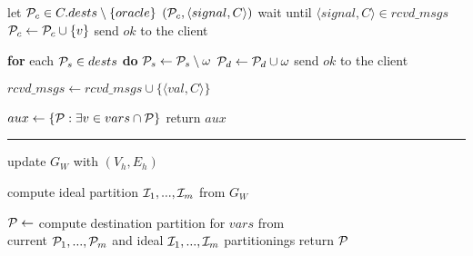 \begin{algorithm}[t!]
\begin{distribalgo}[1]
		\STATE let $\mathcal{P}_c \in C.dests \setminus \{oracle\}$
		\STATE \rmcast$(\mathcal{P}_c, \langle signal, C \rangle )$
		\STATE wait until $\langle signal, C \rangle \in rcvd\_msgs$
		\STATE $\mathcal{P}_c \leftarrow \mathcal{P}_c \cup      \{v\}$
                \STATE send $ok$ to the client
	\ENDINDENT

	\vspace{1.0mm}
                \STATE \textbf{for} each $\mathcal{P}_s \in dests$ \textbf{do} $\mathcal{P}_s \leftarrow \mathcal{P}_s \setminus \omega$
                \STATE $\mathcal{P}_d \leftarrow \mathcal{P}_d \cup \omega$
                \STATE send $ok$ to the client
	\ENDINDENT

        \vspace{1.0mm}
    
		\STATE $rcvd\_msgs \leftarrow rcvd\_msgs \cup \{\langle val, C \rangle\}$
	\ENDINDENT
	
	\vspace{1.0mm}
		\STATE $aux \leftarrow \{ \mathcal{P} : \exists v \in vars \cap \mathcal{P} \}$
		\STATE return $aux$
	\ENDINDENT
	
	\rule{83mm}{0.4pt}

		\STATE update $G_W$ with $(V_h,E_h)$
	\ENDINDENT
	
	\vspace{1.0mm}
    
		\STATE compute ideal partition $\mathcal{I}_1, ..., \mathcal{I}_m$ from $G_W$
	\ENDINDENT
	
	\vspace{1.0mm}
    
		\STATE $\mathcal{P} \leftarrow$ compute destination partition for $vars$ from\\ \hspace{8mm}current $\mathcal{P}_1, ..., \mathcal{P}_m$ and ideal $\mathcal{I}_1, ..., \mathcal{I}_m$ partitionings
		\STATE return $\mathcal{P}$
	\ENDINDENT	
	

\end{distribalgo}
\end{algorithm}

